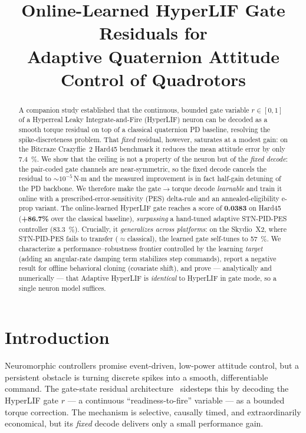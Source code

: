 \documentclass[conference]{IEEEtran}
\title{Online-Learned HyperLIF Gate Residuals for\\Adaptive Quaternion Attitude Control of Quadrotors}
\author{
  \IEEEauthorblockN{Anonymous Author(s)}
  \IEEEauthorblockA{Affiliation withheld for review}
}
\newcommand{\best}[1]{\textbf{#1}}
\begin{document}
\maketitle

\begin{abstract}
A companion study established that the continuous, bounded gate variable
$r\in[0,1]$ of a Hyperreal Leaky Integrate-and-Fire (HyperLIF) neuron can be
decoded as a smooth torque residual on top of a classical quaternion PD
baseline, resolving the spike-discreteness problem. That \emph{fixed} residual,
however, saturates at a modest gain: on the Bitcraze Crazyflie~2 Hard45
benchmark it reduces the mean attitude error by only \SI{7.4}{\percent}. We show
that the ceiling is not a property of the neuron but of the \emph{fixed decode}:
the pair-coded gate channels are near-symmetric, so the fixed decode cancels the
residual to $\sim\!10^{-5}$\,N$\cdot$m and the measured improvement is in fact
half-gain detuning of the PD backbone. We therefore make the gate$\rightarrow$torque
decode \emph{learnable} and train it online with a prescribed-error-sensitivity
(PES) delta-rule and an annealed-eligibility e-prop variant. The online-learned
HyperLIF gate reaches a score of \best{0.0383} on Hard45 (\best{+86.7\%} over the
classical baseline), \emph{surpassing} a hand-tuned adaptive STN-PID-PES
controller (\SI{+83.3}{\percent}). Crucially, it \emph{generalizes across
platforms}: on the Skydio~X2, where STN-PID-PES fails to transfer
($\approx$classical), the learned gate self-tunes to \SI{+57}{\percent}. We
characterize a performance--robustness frontier controlled by the learning
\emph{target} (adding an angular-rate damping term stabilizes step commands),
report a negative result for offline behavioral cloning (covariate shift), and
prove --- analytically and numerically --- that Adaptive HyperLIF is
\emph{identical} to HyperLIF in gate mode, so a single neuron model suffices.
\end{abstract}

\section{Introduction}
Neuromorphic controllers promise event-driven, low-power attitude control, but a
persistent obstacle is turning discrete spikes into a smooth, differentiable
command. The gate-state residual architecture~\cite{paper4gate} sidesteps this by
decoding the HyperLIF gate $r$ --- a continuous ``readiness-to-fire'' variable ---
as a bounded torque correction. The mechanism is selective, causally timed, and
extraordinarily economical, but its \emph{fixed} decode delivers only a small
performance gain.
\end{document}
